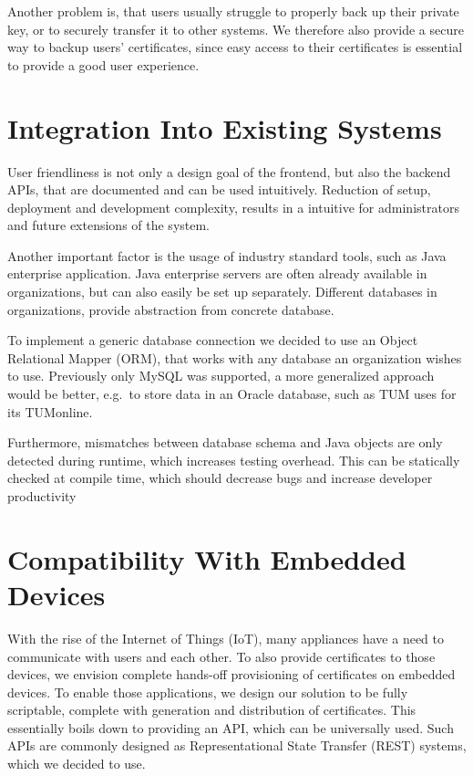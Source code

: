 Another problem is, that users usually struggle to properly back up their private key, or to securely transfer it to
other systems.
We therefore also provide a secure way to backup users' certificates, since easy access to their certificates is
essential to provide a good user experience.

\section{Integration Into Existing Systems}\label{sec:integrationIntoExistingSystems}
User friendliness is not only a design goal of the frontend, but also the backend APIs, that are documented and can be
used intuitively.
Reduction of setup, deployment and development complexity, results in a intuitive for administrators and future
extensions of the system.

Another important factor is the usage of industry standard tools, such as Java enterprise application.
Java enterprise servers are often already available in organizations, but can also easily be set up separately.
Different databases in organizations, provide abstraction from concrete database.

To implement a generic database connection we decided to use an Object Relational Mapper (ORM), that works with any
database an organization wishes to use.
Previously only MySQL was supported, a more generalized approach would be better, e.g.\ to store data in an Oracle
database, such as TUM uses for its TUMonline.

Furthermore, mismatches between database schema and Java objects are only detected during runtime, which increases
testing overhead.
This can be statically checked at compile time, which should decrease bugs and increase developer productivity

\section{Compatibility With Embedded Devices}\label{sec:compatibilityWithEmbeddedDevices}
With the rise of the Internet of Things (IoT), many appliances have a need to communicate with users and each other.
To also provide certificates to those devices, we envision complete hands-off provisioning of certificates on embedded
devices.
To enable those applications, we design our solution to be fully scriptable, complete with generation and distribution
of certificates.
This essentially boils down to providing an API, which can be universally used.
Such APIs are commonly designed as Representational State Transfer (REST) systems, which we decided to use.


